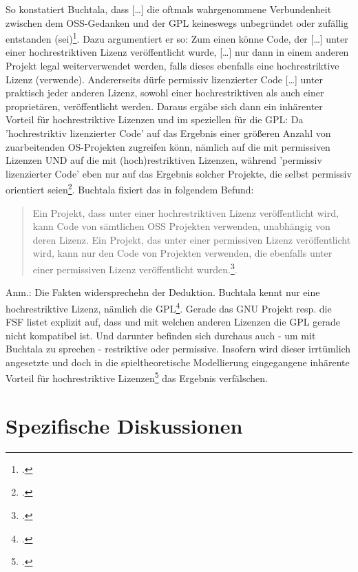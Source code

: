 \documentclass[DIV=calc,BCOR=5mm,11pt,headings=small,oneside,abstract=true, toc=bib]{scrartcl}
\begin{document}
So konstatiert Buchtala, dass \glqq{}[\ldots] die oftmals wahrgenommene
Verbundenheit zwischen dem OSS-Gedanken und der GPL keineswegs unbegründet oder
zufällig entstanden (sei)\grqq{}\footcite[cf.][168]{Buchtala2007a}. Dazu
argumentiert er so: Zum einen könne \glqq{}Code\grqq{}, der \glqq{}[\ldots]
unter einer hochrestriktiven Lizenz veröffentlicht wurde, [\ldots] nur dann in
einem anderen Projekt legal weiterverwendet werden, falls dieses ebenfalls eine
hochrestriktive Lizenz (verwende)\grqq{}. Andererseits dürfe
\glqq{}permissiv\grqq{} lizenzierter Code \glqq{}[\ldots] unter praktisch jeder
anderen Lizenz, sowohl einer hochrestriktiven als auch einer proprietären,
veröffentlicht werden\grqq{}. Daraus ergäbe sich dann \glqq{}ein inhärenter
Vorteil für hochrestriktive Lizenzen und im speziellen für die GPL\grqq{}: Da
'hochrestriktiv lizenzierter Code' auf das Ergebnis einer größeren Anzahl von
zuarbeitenden OS-Projekten zugreifen könn, nämlich auf die mit permissiven
Lizenzen UND auf die mit (hoch)restriktiven Lizenzen, während 'permissiv
lizenzierter Code' eben nur auf das Ergebnis solcher Projekte, die
selbst permissiv orientiert seien\footcite[cf.][165]{Buchtala2007a}. Buchtala
fixiert das in folgendem Befund:
\begin{quotation}\noindent
\glqq{}Ein Projekt, dass unter einer hochrestriktiven Lizenz veröffentlicht
wird, kann Code von sämtlichen OSS Projekten verwenden, unabhängig von deren Lizenz. Ein
Projekt, das unter einer permissiven Lizenz veröffentlicht wird, kann nur den
Code von Projekten verwenden, die ebenfalls unter einer permissiven Lizenz
veröffentlicht wurden.\grqq{}\footcite[][165]{Buchtala2007a}.
\end{quotation}

Anm.: Die Fakten widersprechehn der Deduktion. Buchtala kennt nur eine
hochrestriktive Lizenz, nämlich die
GPL\grqq{}\footcite[cf.][62]{Buchtala2007a}. Gerade das GNU Projekt resp. die
FSF listet explizit auf, dass und mit welchen anderen Lizenzen die GPL gerade
nicht kompatibel ist. Und darunter befinden sich durchaus auch - um mit Buchtala
zu sprechen - restriktive oder permissive. Insofern wird dieser irrtümlich
angesetzte und doch in die spieltheoretische Modellierung eingegangene
\glqq{}inhärente Vorteil für hochrestriktive
Lizenzen\grqq{}\grqq{}\footcite[cf.][168]{Buchtala2007a} das Ergebnis
verfälschen.

\section{Spezifische Diskussionen}
\end{document}
